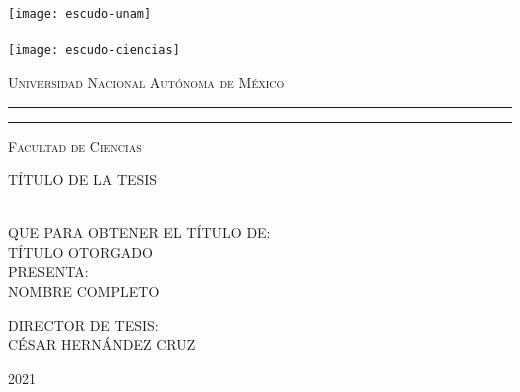 



\newcommand{\titulo}[1]{\def\eltitulo{#1}}
\newcommand{\carrera}[1]{\def\lacarrera{#1}}
\newcommand{\nombre}[1]{\def\elnombre{#1}}      %
\newcommand{\director}[1]{\def\eldirector{#1}}  %
\newcommand{\fecha}[1]{\def\lafecha{#1}}

\titulo{T\'ITULO DE LA TESIS}
\nombre{\uppercase{NOMBRE COMPLETO}}
\carrera{T\'ITULO OTORGADO}
\director{\uppercase{C\'ESAR HERN\'ANDEZ CRUZ}}
\fecha{2021}


\thispagestyle{empty}

\hskip-1.5cm
\begin{minipage}[c][10cm][s]{3cm}
  \begin{center}
    \texttt{[image: escudo-unam]}\\[10pt]
    \hskip2pt\vrule width2pt height13cm\hskip1mm
    \vrule width1pt height13cm\\[10pt]
    \texttt{[image: escudo-ciencias]}
  \end{center}
\end{minipage}\quad
\begin{minipage}[c][9.5cm][s]{10cm}
  \begin{center}
    {\large \scshape Universidad Nacional Aut\'onoma de M\'exico}
    \vspace{.3cm}
    \hrule height2pt
    \vspace{.1cm}
    \hrule height1pt
    \vspace{.3cm}
    {\scshape Facultad de Ciencias}

    \vspace{3cm}

    {\Large \eltitulo}

    \vspace{3cm}

    \\[8pt]
    QUE PARA OBTENER EL T\'ITULO DE:\\[3pt]
    \mbox{}\lacarrera\\[13pt]
    PRESENTA:\\[3pt]
    \elnombre

    \vspace{2cm}

    {\small DIRECTOR DE TESIS:\\ \eldirector}

    \vspace{2cm}

    \lafecha

  \end{center}
\end{minipage}
